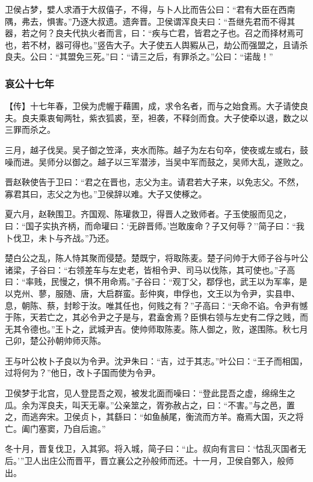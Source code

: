 \documentclass[]{article}
\begin{document}
卫侯占梦，嬖人求酒于大叔僖子，不得，与卜人比而告公曰：``君有大臣在西南隅，弗去，惧害。''乃逐大叔遗。遗奔晋。卫侯谓浑良夫曰：``吾继先君而不得其器，若之何？良夫代执火者而言，曰：``疾与亡君，皆君之子也。召之而择材焉可也，若不材，器可得也。''竖告大子。大子使五人舆豭从己，劫公而强盟之，且请杀良夫。公曰：``其盟免三死。''曰：``请三之后，有罪杀之。''公曰：``诺哉！''

\hypertarget{header-n3228}{%
\subsubsection{哀公十七年}\label{header-n3228}}

【传】十七年春，卫侯为虎幄于藉圃，成，求令名者，而与之始食焉。大子请使良夫。良夫乘衷甸两牡，紫衣狐裘，至，袒袭，不释剑而食。大子使牵以退，数之以三罪而杀之。

三月，越子伐吴。吴子御之笠泽，夹水而陈。越子为左右句卒，使夜或左或右，鼓噪而进。吴师分以御之。越子以三军潜涉，当吴中军而鼓之，吴师大乱，遂败之。

晋赵鞅使告于卫曰：``君之在晋也，志父为主。请君若大子来，以免志父。不然，寡君其曰，志父之为也。''卫侯辞以难。大子又使椓之。

夏六月，赵鞅围卫。齐国观、陈瓘救卫，得晋人之致师者。子玉使服而见之，曰：``国子实执齐柄，而命瓘曰：`无辟晋师。'岂敢废命？子又何辱？''简子曰：``我卜伐卫，未卜与齐战。''乃还。

楚白公之乱，陈人恃其聚而侵楚。楚既宁，将取陈麦。楚子问帅于大师子谷与叶公诸梁，子谷曰：``右领差车与左史老，皆相令尹、司马以伐陈，其可使也。''子高曰：``率贱，民慢之，惧不用命焉。''子谷曰：``观丁父，鄀俘也，武王以为军率，是以克州、蓼，服随、唐，大启群蛮。彭仲爽，申俘也，文王以为令尹，实县申、息，朝陈、蔡，封畛于汝。唯其任也，何贱之有？''子高曰：``天命不谄。令尹有憾于陈，天若亡之，其必令尹之子是与，君盍舍焉？臣惧右领与左史有二俘之贱，而无其令德也。''王卜之，武城尹吉。使帅师取陈麦。陈人御之，败，遂围陈。秋七月己卯，楚公孙朝帅师灭陈。

王与叶公枚卜子良以为令尹。沈尹朱曰：``吉，过于其志。''叶公曰：``王子而相国，过将何为？''他日，改卜子国而使为令尹。

卫侯梦于北宫，见人登昆吾之观，被发北面而噪曰：``登此昆吾之虚，绵绵生之瓜。余为浑良夫，叫天无辜。''公亲筮之，胥弥赦占之，曰：``不害。''与之邑，置之，而逃奔宋。卫侯贞卜，其繇曰：``如鱼赬尾，衡流而方羊。裔焉大国，灭之将亡。阖门塞窦，乃自后逾。''

冬十月，晋复伐卫，入其郛。将入城，简子曰：``止。叔向有言曰：`怙乱灭国者无后。'''卫人出庄公而晋平，晋立襄公之孙般师而还。十一月，卫侯自鄄入，般师出。
\end{document}
